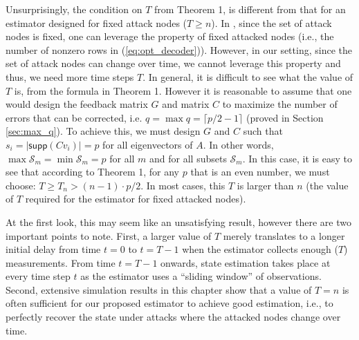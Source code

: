 \documentclass[../../thesis.tex]{subfiles}
\begin{document}
Unsurprisingly, the condition on $T$ from Theorem 1, is different from that for an estimator designed for fixed attack nodes ($T\geq n$). In \cite{Fawzi:2014}, since the set of attack nodes is fixed, one can leverage the property of fixed attacked nodes (i.e., the number of nonzero rows in (\ref{eq:opt_decoder})). However, in our setting, since the set of attack nodes can change over time, we cannot leverage this property and thus, we need more time steps $T$.
In general, it is difficult to see what the value of $T$ is, from the formula in Theorem 1. However it is reasonable to assume that one would design the feedback matrix $G$ and matrix $C$ to maximize the number of errors that can be corrected, i.e. $q = \max q = \lceil p/2 - 1 \rceil$ (proved in Section \ref{sec:max_q}). To achieve this, we must design $G$ and $C$ such that $s_i = \lvert \textsf{supp} (C v_i) \rvert = p$ for all eigenvectors of $A$. In other words, $\operatorname{max} \mathcal{S}_m = \operatorname{min} \mathcal{S}_m = p$ for all $m$ and for all subsets $\mathcal{S}_m$. 
In this case, it is easy to see that according to Theorem 1, for any $p$ that is an even number, we must choose: $T\geq T_n > (n-1) \cdot p/2$.
In most cases, this $T$ is larger than $n$ (the value of $T$ required for the estimator for fixed attacked nodes).

At the first look, this may seem like an unsatisfying result, however there are two important points to note. First, a larger value of $T$ merely translates to a longer initial delay from time $t = 0$ to $t=T-1$ when the estimator collects enough ($T$) measurements. From time $t=T-1$ onwards, state estimation takes place at every time step $t$ as the estimator uses a ``sliding window'' of observations. Second, extensive simulation results in this chapter show that a value of $T = n$ is often sufficient for our proposed estimator to achieve good estimation, i.e., to perfectly recover the state under attacks where the attacked nodes change over time. 
\end{document}
